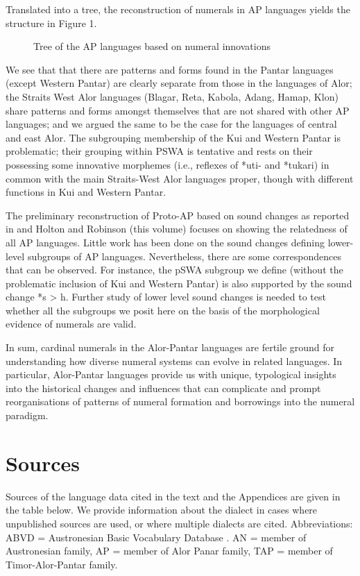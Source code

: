 {Translated into a tree, the reconstruction of numerals in AP languages yields the structure in Figure 1.


\begin{figure}
\caption{Tree of the AP languages based on numeral innovations}
\end{figure}

We see that that there are patterns and forms found in the Pantar languages (except Western Pantar) are clearly separate from those in the languages of Alor; the Straits West Alor languages (Blagar, Reta, Kabola, Adang, Hamap, Klon) share patterns and forms amongst themselves that are not shared with other AP languages; and we argued the same to be the case for the languages of central and east Alor. The subgrouping membership of the Kui and Western Pantar is problematic; their grouping within PSWA is tentative and rests on their possessing some innovative morphemes (i.e., reflexes of *{\texthtb}uti- and *tukari) in common with the main Straits-West Alor languages proper, though with different functions in Kui and Western Pantar.

The preliminary reconstruction of Proto-AP based on sound changes as reported in \citet{HoltonEtAl2012} and Holton and Robinson (this volume) focuses on showing the relatedness of all AP languages. Little work has been done on the sound changes defining lower-level subgroups of AP languages. Nevertheless, there are some correspondences that can be observed. For instance, the pSWA subgroup we define (without the problematic inclusion of Kui and Western Pantar) is also supported by the sound change *s {\textgreater} h. Further study of lower level sound changes is needed to test whether all the subgroups we posit here on the basis of the morphological evidence of numerals are valid.

In sum, cardinal numerals in the Alor-Pantar languages are fertile ground for understanding how diverse numeral systems can evolve in related languages. In particular, Alor-Pantar languages provide us with unique, typological insights into the historical changes and influences that can complicate and prompt reorganisations of patterns of numeral formation and borrowings into the numeral paradigm.


\section{Sources}
Sources of the language data cited in the text and the Appendices are given in the table below. We provide information about the dialect in cases where unpublished sources are used, or where multiple dialects are cited. Abbreviations: ABVD = Austronesian Basic Vocabulary Database \citep{GreenhillEtAl20052007}. AN = member of Austronesian family, AP = member of Alor Panar family, TAP = member of Timor-Alor-Pantar family.





}
